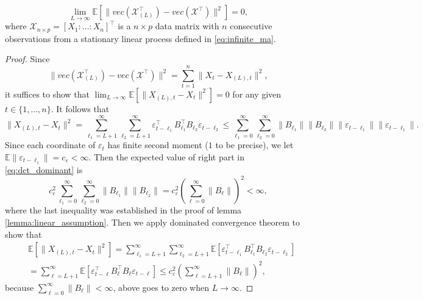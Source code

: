 \begin{lem}
\label{lemma:L2_convergence_truncate}
\begin{equation}
\lim_{L\rightarrow \infty}\mathbb{E} \left[ \|vec(\mathcal{\mathcal{X}}_{(L)}^\top) - vec(\mathcal{\mathcal{X}}^\top)\|^2 \right]  = 0, \nonumber
\end{equation}
where $\mathcal{\mathcal{X}}_{n\times p} = [{X}_1: \ldots : {X}_n]^\top$ is a $n \times p$ data matrix with $n$ consecutive observations from a stationary linear process defined in \eqref{eq:infinite_ma}.
\begin{proof}
Since
\begin{equation}
\|vec(\mathcal{\mathcal{X}}_{(L)}^\top) - vec(\mathcal{\mathcal{X}}^\top)\|^2 = \sum_{t=1}^n \|{X}_t-{X}_{(L), t}\|^2, \nonumber
\end{equation}
it suffices to show that $\lim_{L\rightarrow \infty}\mathbb{E} \left[ \|{X}_{(L), t} - {X}_t\|^2 \right] = 0$ for any given $t\in \{1,\dots, n\}$. It follows that 
\begin{equation}
\label{eq:dct_dominant}
\|{X}_{(L), t}-{X}_t\|^2 = \sum_{\ell_1=L+1}^\infty \sum_{\ell_2=L+1}^\infty \varepsilon_{t-{\ell_1}}^\top B^\top_{\ell_1} B_{\ell_2}\varepsilon_{t-{\ell_2}} \le \sum_{\ell_1=0}^\infty \sum_{\ell_2=0}^\infty\|B_{\ell_1}\|\|B_{\ell_2}\|\|\varepsilon_{t-{\ell_1}}\|
\|\varepsilon_{t-{\ell_1}}\|.
\end{equation}
Since each coordinate of $\varepsilon_t$ has finite second moment ($1$ to be precise), we let 
$\mathbb{E}\|\varepsilon_{t-{\ell_1}}\| = c_\varepsilon <\infty $. Then the expected value of right part in \eqref{eq:dct_dominant} is
\begin{equation}
c_\varepsilon^2 \sum_{\ell_1=0}^{\infty}\sum_{\ell_2=0}^{\infty} \|B_{\ell_1}\| \|B_{\ell_2}\| = c_\varepsilon^2(\sum_{\ell=0}^\infty \|B_{\ell}\|)^2<\infty, \nonumber
\end{equation}
where the last inequality was established in the proof of lemma \ref{lemma:linear_assumption}. Then we apply dominated convergence theorem to show that 
\begin{equation*}
\begin{aligned}
&\mathbb{E} \left[\|{X}_{(L), t}-{X}_t\|^2 \right] = \sum_{\ell_1=L+1}^\infty \sum_{\ell_2=L+1}^\infty \mathbb{E}\left[ \varepsilon_{t-{\ell_1}}^\top B^\top_{\ell_1} B_{\ell_2}\varepsilon_{t-{\ell_2}} \right]\\
& = \sum_{\ell=L+1}^\infty \mathbb{E} \left[ \varepsilon_{t-\ell}^\top B^\top_{\ell} B_{\ell} \varepsilon_{t-\ell} \right] \le c_\varepsilon^2 (\sum_{\ell=L+1}^\infty \|B_\ell\|)^2,
\end{aligned}
\end{equation*}
because $\sum_{\ell=0}^\infty \|B_\ell\|<\infty$, above goes to zero when $L\rightarrow \infty$. 
\end{proof}
\end{lem}
